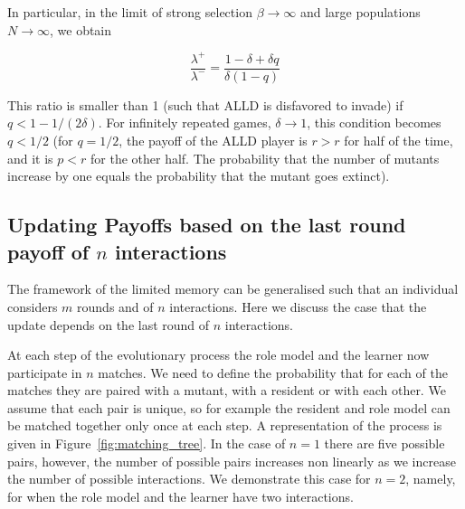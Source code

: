 \documentclass[11pt]{article}
\theoremstyle{plainCl1}
\theoremstyle{plainCl2}
\begin{document}
In particular, in the limit of strong selection \(\beta \rightarrow \infty\) and
large populations \(N \rightarrow \infty \), we obtain

\begin{equation*}
    \frac{\lambda^{+}}{\lambda^{-}} = \frac{1 - \delta + \delta q}{\delta(1 - q)}
\end{equation*}

This ratio is smaller than 1 (such that ALLD is disfavored to invade) if \(q <
1- 1/(2 \delta)\). For infinitely repeated games, \(\delta \rightarrow 1\), this
condition becomes \(q < 1/2\) (for \(q = 1/2\), the payoff of the ALLD player is
\(r > r\) for half of the time, and it is \(p < r\) for the other half. The
probability that the number of mutants increase by one equals the probability
that the mutant goes extinct).

\subsection{Updating Payoffs based on the last round payoff of $n$ interactions}\label{section:m_one_n_two}

The framework of the limited memory can be generalised such that an individual
considers \(m\) rounds and of \(n\) interactions. Here we discuss the case that
the update depends on the last round of \(n\) interactions.

At each step of the evolutionary process the role model and the learner now
participate in \(n\) matches. We need to define the probability that for each of
the matches they are paired with a mutant, with a resident or with each other.
We assume that each pair is unique, so for example the resident and role model
can be matched together only once at each step. A representation of the process
is given in Figure~\ref{fig:matching_tree}. In the case of \(n=1\) there are
five possible pairs, however, the number of possible pairs increases non
linearly as we increase the number of possible interactions. We demonstrate this
case for \(n=2\), namely, for when the role model and the learner have two
interactions.
\end{document}
